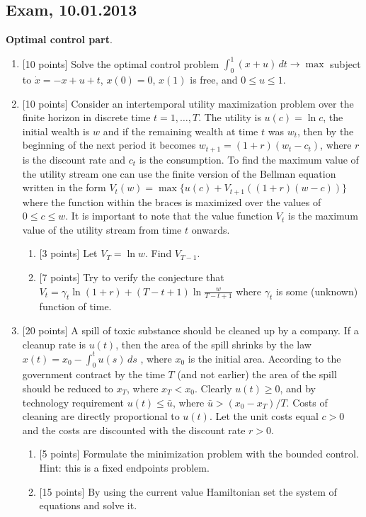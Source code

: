 \documentclass[12pt, a4paper]{article}
\begin{document}
\subsection{Exam, 10.01.2013}

\textbf{Optimal control part}.

\vspace{20pt}

\begin{enumerate}
\item $[$10 points] Solve the optimal control problem
$\int_0^1 (x+u)\, dt \to \max$
subject to $\dot{x}=-x+u+t$, $x(0)=0$, $x(1)$ is free, and $0\leq u\leq 1$.

\item $[$10 points] Consider an intertemporal utility maximization problem over the finite horizon in discrete time $t=1,\ldots,T$. The utility is $u(c)=\ln c$, the initial wealth is $w$ and if the remaining wealth at time $t$ was $w_t$, then by the beginning of the next period it becomes $w_{t+1}=(1+r)(w_t-c_t)$, where $r$ is the discount rate and $c_t$ is the consumption.  To find the maximum value of the utility stream one can use the finite version of the Bellman equation written in the form
$V_t(w)=\max \{ u(c) + V_{t+1}((1+r)(w-c)) \}$
where the function within the braces is maximized over the values of $0 \leq c \leq w$. It is important to note that the value function $V_t$ is the maximum value of the utility stream from time $t$ onwards.
\begin{enumerate}
\item $[$3 points] Let $V_T=\ln w$. Find $V_{T-1}$.
\item $[$7 points] Try to verify the conjecture that
$V_t=\gamma_t \ln (1+r) + (T-t+1) \ln \frac{w}{T-t+1} $
where $\gamma_t$ is some (unknown) function of time.
\end{enumerate}

\item $[$20 points] A spill of toxic substance should be cleaned up by a company.  If a cleanup rate is $u(t)$, then the area of the spill shrinks by the law
$x(t)=x_0-\int_0^t u(s)\, ds$
, where $x_0$ is the initial area. According to the government contract by the time $T$ (and not earlier) the area of the spill should  be reduced to $x_T$, where $x_T<x_0$.  Clearly $u(t)\geq 0$, and by technology requirement $u(t)\leq \bar{u}$, where $\bar{u}>(x_0-x_T)/T$. Costs of cleaning are directly proportional to $u(t)$. Let the unit costs equal $c>0$ and the costs are discounted with the discount rate $r>0$.
\begin{enumerate}
\item $[$5 points] Formulate the minimization problem with the bounded control. Hint: this is a fixed endpoints problem.
\item $[$15 points] By using the current value Hamiltonian set the system of equations and solve it.
\end{enumerate}
\end{enumerate}
\end{document}
